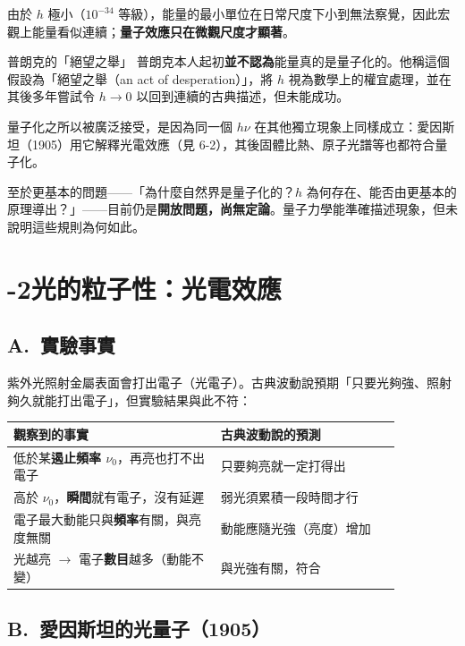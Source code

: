 \documentclass[11pt]{article}
\begin{document}
由於 $h$ 極小（$10^{-34}$ 等級），能量的最小單位在日常尺度下小到無法察覺，因此宏觀上能量看似連續；\textbf{量子效應只在微觀尺度才顯著}。

\begin{延伸框}{普朗克的「絕望之舉」}
普朗克本人起初\textbf{並不認為}能量真的是量子化的。他稱這個假設為「絕望之舉（an act of desperation）」，將 $h$ 視為數學上的權宜處理，並在其後多年嘗試令 $h\to0$ 以回到連續的古典描述，但未能成功。

量子化之所以被廣泛接受，是因為同一個 $h\nu$ 在其他獨立現象上同樣成立：愛因斯坦（1905）用它解釋光電效應（見 6-2），其後固體比熱、原子光譜等也都符合量子化。

至於更基本的問題——「為什麼自然界是量子化的？$h$ 為何存在、能否由更基本的原理導出？」——目前仍是\textbf{開放問題，尚無定論}。量子力學能準確描述現象，但未說明這些規則為何如此。
\end{延伸框}

\section*{-2\quad 光的粒子性：光電效應}

\subsection*{\sffamily A.\ 實驗事實}

紫外光照射金屬表面會打出電子（光電子）。古典波動說預期「只要光夠強、照射夠久就能打出電子」，但實驗結果與此不符：

\begin{center}
\renewcommand{\arraystretch}{1.35}
\begin{tabular}{p{0.46\linewidth} p{0.40\linewidth}}
\hline
\textbf{觀察到的事實} & \textbf{古典波動說的預測} \\
\hline
低於某\textbf{遏止頻率 $\nu_0$}，再亮也打不出電子 & 只要夠亮就一定打得出 \\
高於 $\nu_0$，\textbf{瞬間}就有電子，沒有延遲 & 弱光須累積一段時間才行 \\
電子最大動能只與\textbf{頻率}有關，與亮度無關 & 動能應隨光強（亮度）增加 \\
光越亮 $\rightarrow$ 電子\textbf{數目}越多（動能不變） & 與光強有關，符合 \\
\hline
\end{tabular}
\end{center}

\subsection*{\sffamily B.\ 愛因斯坦的光量子（1905）}
\end{document}
